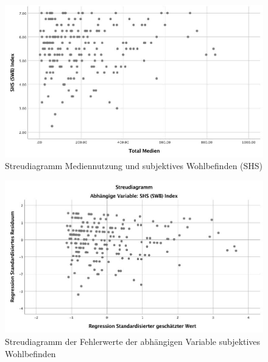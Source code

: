 \begin{figure}[h]
  \centering
     \includegraphics[scale=0.4]{content/Grafik/Streudiagramm_Hypo3.jpg}
  \captionsetup{margin=80pt}
  \caption{Streudiagramm Mediennutzung und subjektives Wohlbefinden (SHS)}
  \label{fig:AppHypo3Streudiagramm}
\end{figure}

\begin{figure}[h]
  \centering
     \includegraphics[scale=0.4]{content/Grafik/Streudiagramm_Hypo3_Residuen.jpg}
  \captionsetup{margin=80pt}
  \caption{Streudiagramm der Fehlerwerte  der abhängigen Variable subjektives Wohlbefinden}
  \label{fig:AppHypo3StreudiagrammResiduen}
\end{figure}